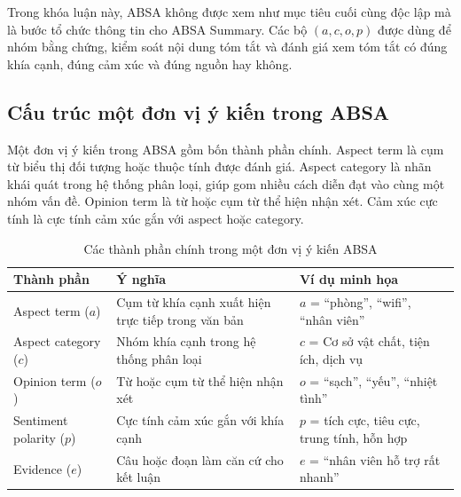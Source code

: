 Trong khóa luận này, ABSA không được xem như mục tiêu cuối cùng độc lập mà là bước tổ chức thông tin cho ABSA Summary. Các bộ $(a,c,o,p)$ được dùng để nhóm bằng chứng, kiểm soát nội dung tóm tắt và đánh giá xem tóm tắt có đúng khía cạnh, đúng cảm xúc và đúng nguồn hay không.

\subsection{Cấu trúc một đơn vị ý kiến trong ABSA}
\label{subsec:chap2-absa-components}

Một đơn vị ý kiến trong ABSA gồm bốn thành phần chính. Aspect term là cụm từ biểu thị đối tượng hoặc thuộc tính được đánh giá. Aspect category là nhãn khái quát trong hệ thống phân loại, giúp gom nhiều cách diễn đạt vào cùng một nhóm vấn đề. Opinion term là từ hoặc cụm từ thể hiện nhận xét. Cảm xúc cực tính là cực tính cảm xúc gắn với aspect hoặc category.


\begin{table}[htbp]
\centering
\caption{Các thành phần chính trong một đơn vị ý kiến ABSA}
\label{tab:chap2-absa-components}
\begin{tabular}{p{}p{}>{\raggedright\arraybackslash}p{}}
\toprule
\textbf{Thành phần} & \textbf{Ý nghĩa} & \textbf{Ví dụ minh họa} \\
\midrule
Aspect term ($a$) & Cụm từ khía cạnh xuất hiện trực tiếp trong văn bản & $a$ = ``phòng'', ``wifi'', ``nhân viên'' \\ \addlinespace[2pt]
Aspect category ($c$) & Nhóm khía cạnh trong hệ thống phân loại & $c$ = Cơ sở vật chất, tiện ích, dịch vụ \\ \addlinespace[2pt]
Opinion term ($o$) & Từ hoặc cụm từ thể hiện nhận xét & $o$ = ``sạch'', ``yếu'', ``nhiệt tình'' \\ \addlinespace[2pt]
Sentiment polarity ($p$) & Cực tính cảm xúc gắn với khía cạnh & $p$ = tích cực, tiêu cực, trung tính, hỗn hợp \\ \addlinespace[2pt]
Evidence ($e$) & Câu hoặc đoạn làm căn cứ cho kết luận & $e$ = ``nhân viên hỗ trợ rất nhanh'' \\
\bottomrule
\end{tabular}
\end{table}

